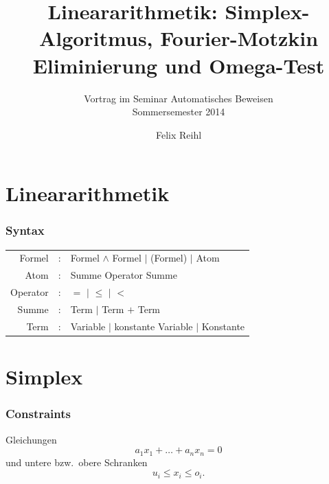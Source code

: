 \documentclass[hyperref={pdfpagelabels=false}]{beamer}
\title{Lineararithmetik: Simplex-Algoritmus, Fourier-Motzkin Eliminierung und Omega-Test}
\author{Felix Reihl}
\subtitle{Vortrag im Seminar Automatisches Beweisen\\Sommersemester 2014}
\begin{document}
\begin{frame} \titlepage
\end{frame} 
\begin{frame}
	\tableofcontents
\end{frame} 
\section{Lineararithmetik}
\begin{frame}
	\frametitle{Syntax}
	\begin{table}[H]
		\begin{tabular}{rcl}
			Formel   & : & Formel $\land$ Formel $\mid$ (Formel) $\mid$ Atom \\
			Atom     & : & Summe Operator Summe \\
			Operator & : & $=$ $\mid$ $\leq$ $\mid$ $<$ \\
			Summe    & : & Term $\mid$ Term $+$ Term \\
			Term     & : & Variable $\mid$ konstante Variable $\mid$ Konstante
		\end{tabular}
	\end{table}
\end{frame} 
\section{Simplex}
\begin{frame}
	\frametitle{Constraints}
	Gleichungen
	\[ a_1 x_1 + \dotsc + a_n x_n = 0 \]
	und untere bzw.\ obere Schranken
	\[ u_i \leq x_i \leq o_i. \]
\end{frame}
\end{document}
